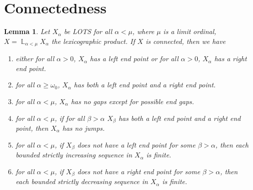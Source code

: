 \documentclass[12pt,oneside,english]{amsbook}
\numberwithin{equation}{section} %
\numberwithin{figure}{section} %
\theoremstyle{plain}
\numberwithin{section}{chapter}
\theoremstyle{plain}
\newtheorem{lem}[thm]{Lemma}
\DeclareMathOperator{\LP}{\mathbb{L}}
\begin{document}
\section{Connectedness}

\begin{lem} \label{lp:c:1}
  Let $X_{\alpha}$ be LOTS for all $\alpha < \mu$, where $\mu$ is a limit ordinal, $X = \LP_{\alpha < \mu}X_{\alpha}$ the lexicographic product. If $X$ is connected, then we have
  \begin{enumerate}
  \item either for all $\alpha > 0$, $X_{\alpha}$ has a left end point or for all $\alpha > 0$, $X_{\alpha}$ has a right end point.
  \item for all $\alpha \geq \omega_0$, $X_{\alpha}$ has both a left end point and a right end point.
  \item for all $\alpha < \mu$, $X_{\alpha}$ has no gaps except for possible end gaps.
  \item for all $\alpha < \mu$, if for all $\beta > \alpha$ $X_{\beta}$ has both a left end point and a right end point, then $X_{\alpha}$ has no jumps.
  \item for all $\alpha < \mu$, if $X_{\beta}$ does not have a left end point for some $\beta > \alpha$, then each bounded strictly increasing sequence in $X_{\alpha}$ is finite.
  \item for all $\alpha < \mu$, if $X_{\beta}$ does not have a right end point for some $\beta > \alpha$, then each bounded strictly decreasing sequence in $X_{\alpha}$ is finite.
  \end{enumerate}
\end{lem}
\end{document}
